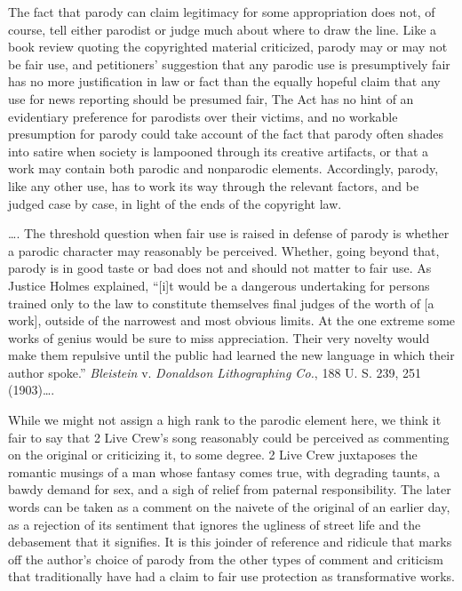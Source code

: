 The fact that parody can claim legitimacy for some appropriation does not, of
course, tell either parodist or judge much about where to draw the line. Like a
book review quoting the copyrighted material criticized, parody may or may not
be fair use, and petitioners' suggestion that any parodic use is presumptively
fair has no more justification in law or fact than the equally hopeful claim
that any use for news reporting should be presumed fair,
The Act has no hint of an evidentiary preference for
parodists over their victims, and no workable presumption for parody could take
account of the fact that parody often shades into satire when society is
lampooned through its creative artifacts, or that a work may contain both
parodic and nonparodic elements. Accordingly, parody, like any other use, has to
work its way through the relevant factors, and be judged case by case, in light
of the ends of the copyright law.

\ldots. The threshold question when fair use is
raised in defense of parody is whether a parodic character may reasonably be
perceived. Whether, going beyond that, parody
is in good taste or bad does not and should not matter to fair use. As Justice
Holmes explained, ``[i]t would be a dangerous undertaking for persons trained
only to the law to constitute themselves final judges of the worth of [a work],
outside of the narrowest and most obvious limits. At the one extreme some works
of genius would be sure to miss appreciation. Their very novelty would make them
repulsive until the public had learned the new language in which their author
spoke.'' \textit{Bleistein} v. \textit{Donaldson Lithographing Co.}, 188 U. S.
239, 251 (1903)\ldots.

While we might not assign a high rank to the parodic element here, we think it
fair to say that 2 Live Crew's song reasonably could be perceived as commenting
on the original or criticizing it, to some degree. 2 Live Crew juxtaposes the
romantic musings of a man whose fantasy comes true, with degrading taunts, a
bawdy demand for sex, and a sigh of relief from paternal responsibility. The
later words can be taken as a comment on the naivete of the original of an
earlier day, as a rejection of its sentiment that ignores the ugliness of street
life and the debasement that it signifies. It is this joinder of reference and
ridicule that marks off the author's choice of parody from the other types of
comment and criticism that traditionally have had a claim to fair use protection
as transformative works.

